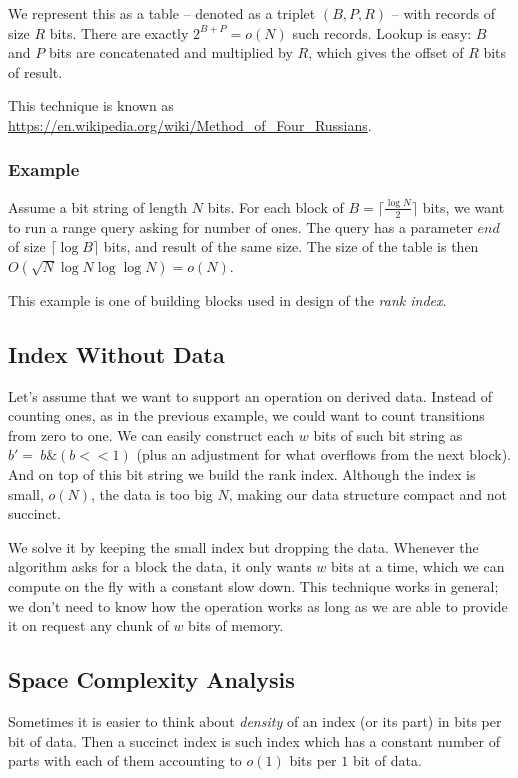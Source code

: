 We represent this as a table -- denoted as a triplet $(B, P, R)$ -- with records of size $R$ bits.
There are exactly $2^{B+P} = o(N)$ such records.
Lookup is easy: $B$ and $P$ bits are concatenated and multiplied by $R$, which gives the offset of $R$ bits of result.

This technique is known as \url{https://en.wikipedia.org/wiki/Method_of_Four_Russians}.

\subsubsection{\label{sss:precomputation-example}Example}

Assume a bit string of length $N$ bits.
For each block of $B = \lceil\frac{\log N}{2}\rceil$ bits, we want to run a range query asking for number of ones.
The query has a parameter $end$ of size $\lceil \log {B} \rceil$ bits, and result of the same size.
The size of the table is then $O(\sqrt{N} \log N \log\log N) = o(N)$.

This example is one of building blocks used in design of the \emph{rank index}.

\subsection{Index Without Data}

Let's assume that we want to support an operation on derived data.
Instead of counting ones, as in the previous example, we could want to count transitions from zero to one.
We can easily construct each $w$ bits of such bit string as $b' = ~b \& (b<<1)$ (plus an adjustment for what overflows from the next block).
And on top of this bit string we build the rank index.
Although the index is small, $o(N)$, the data is too big $N$, making our data structure compact and not succinct.

We solve it by keeping the small index but dropping the data.
Whenever the algorithm asks for a block the data, it only wants $w$ bits at a time, which we can compute on the fly with a constant slow down.
This technique works in general; we don't need to know how the operation works as long as we are able to provide it on request any chunk of $w$ bits of memory.

\subsection{Space Complexity Analysis}

Sometimes it is easier to think about \emph{density} of an index (or its part) in bits per bit of data.
Then a succinct index is such index which has a constant number of parts with each of them accounting to $o(1)$ bits per $1$ bit of data.